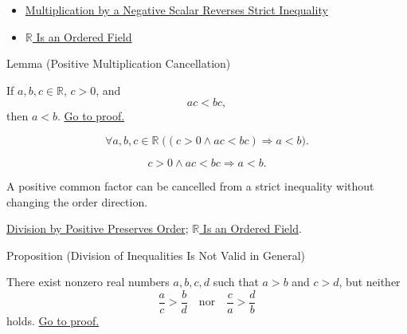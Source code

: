 \begin{dependencies}
\begin{itemize}
  \item \hyperref[thm:ineq-multiply-negative]{Multiplication by a Negative Scalar Reverses Strict Inequality}
  \item \hyperref[thm:r-is-an-ordered-field]{$\mathbb{R}$ Is an Ordered Field}
\end{itemize}
\end{dependencies}

\begin{lemmabox}{Lemma (Positive Multiplication Cancellation)}
\begin{lemma}
\label{lem:positive-multiplication-cancellation}
If $a,b,c\in\mathbb{R}$, $c>0$, and
\[
ac<bc,
\]
then $a<b$.
\hyperref[prf:positive-multiplication-cancellation]{Go to proof.}
\end{lemma}
\end{lemmabox}

\begin{remark*}
\[
\forall a,b,c\in\mathbb{R}\;
\bigl((c>0\land ac<bc)\Rightarrow a<b\bigr).
\]
\end{remark*}

\begin{remark*}
\[
c>0\land ac<bc\Rightarrow a<b.
\]
\end{remark*}

\begin{remark*}[Interpretation]
A positive common factor can be cancelled from a strict inequality without
changing the order direction.
\end{remark*}

\begin{dependencies}
\hyperref[lem:division-by-positive-preserves-order]{Division by Positive Preserves Order};
\hyperref[thm:r-is-an-ordered-field]{$\mathbb{R}$ Is an Ordered Field}.
\end{dependencies}

\begin{propositionbox}{Proposition (Division of Inequalities Is Not Valid in General)}
\begin{proposition}
\label{prop:division-of-inequalities-not-valid}
There exist nonzero real numbers $a,b,c,d$ such that $a>b$ and $c>d$, but
neither
\[
\frac{a}{c}>\frac{b}{d}
\quad\text{nor}\quad
\frac{c}{a}>\frac{d}{b}
\]
holds.
\hyperref[prf:division-of-inequalities-not-valid]{Go to proof.}
\end{proposition}
\end{propositionbox}

